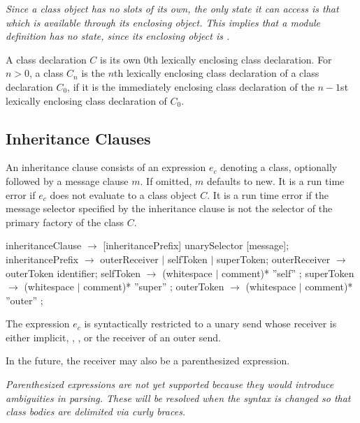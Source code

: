 \documentclass{article}
\newcommand{\code}[1]{{\sf #1}}
\begin{document}
{\it
Since a class object has no slots of its own, the only state it can access is that which is available through its enclosing object. This implies that a module definition has no state, since its enclosing object is \NIL.
}

A class declaration $C$ is its own 0th lexically enclosing class declaration.  For $n > 0$, a class $C_n$ is the $n$th lexically enclosing class declaration of a class declaration $C_0$, if it is the immediately enclosing class declaration of the $n-1$st lexically enclosing class declaration of $C_0$.


\subsection{Inheritance Clauses}
\label{inheritanceClauses}

 An inheritance clause consists of an expression $e_c$ denoting a class, optionally followed by a message clause $m$.  If omitted, $m$ defaults to \code{new}.  It is a run time error if $e_c$ does not evaluate to a class object $C$.  
It is a run time error if the message selector  specified by the inheritance clause is not the selector of the primary factory of the class $C$.
 
  \begin{newspeak}
inheritanceClause $\rightarrow$ [inheritancePrefix] unarySelector [message];
inheritancePrefix $\rightarrow$ outerReceiver $|$  
                              selfToken $|$  
                              superToken;
outerReceiver $\rightarrow$ outerToken  identifier;
selfToken $\rightarrow$ (whitespace $|$ comment)* ''self'' ;
superToken $\rightarrow$ (whitespace $|$ comment)* ''super'' ;
outerToken $\rightarrow$ (whitespace $|$ comment)* ''outer'' ;
\end{newspeak}
 
The expression $e_c$ is syntactically restricted to a unary send whose receiver is either implicit, \SELF{}, \SUPER{}, or the receiver of an outer send. %

In the future, the receiver may also be a parenthesized expression.
 
 {\em Parenthesized expressions are not yet supported because they would introduce ambiguities in parsing. These will be resolved when the syntax is changed so that class bodies are delimited via curly braces. }
 
\end{document}

